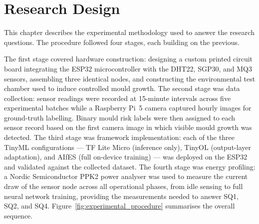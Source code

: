 \chapter{Research Design}\label{chap:research}

This chapter describes the experimental methodology used to answer the research questions. The procedure followed four stages, each building on the previous.

The first stage covered hardware construction: designing a custom printed circuit board integrating the ESP32 microcontroller with the DHT22, SGP30, and MQ3 sensors, assembling three identical nodes, and constructing the environmental test chamber used to induce controlled mould growth. The second stage was data collection: sensor readings were recorded at 15-minute intervals across five experimental batches while a Raspberry Pi~5 camera captured hourly images for ground-truth labelling. Binary mould risk labels were then assigned to each sensor record based on the first camera image in which visible mould growth was detected. The third stage was framework implementation: each of the three TinyML configurations --- TF Lite Micro (inference only), TinyOL (output-layer adaptation), and AIfES (full on-device training) --- was deployed on the ESP32 and validated against the collected dataset. The fourth stage was energy profiling: a Nordic Semiconductor PPK2 power analyser was used to measure the current draw of the sensor node across all operational phases, from idle sensing to full neural network training, providing the measurements needed to answer SQ1, SQ2, and SQ4. Figure~\ref{fig:experimental_procedure} summarises the overall sequence.

